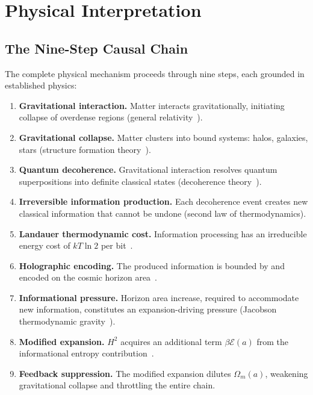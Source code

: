 \documentclass[twocolumn,superscriptaddress,prl,amsmath,amssymb]{revtex4-2}
\begin{document}
\section{Physical Interpretation}
\label{sec:interpretation}

\subsection{The Nine-Step Causal Chain}

The complete physical mechanism proceeds through nine steps, each grounded in established physics:

\begin{enumerate}
\item \textbf{Gravitational interaction.} Matter interacts gravitationally, initiating collapse of overdense regions (general relativity~\cite{Einstein1915}).
\item \textbf{Gravitational collapse.} Matter clusters into bound systems: halos, galaxies, stars (structure formation theory~\cite{Peebles1980}).
\item \textbf{Quantum decoherence.} Gravitational interaction resolves quantum superpositions into definite classical states (decoherence theory~\cite{Zurek2003}).
\item \textbf{Irreversible information production.} Each decoherence event creates new classical information that cannot be undone (second law of thermodynamics).
\item \textbf{Landauer thermodynamic cost.} Information processing has an irreducible energy cost of $kT\ln 2$ per bit~\cite{Landauer1961}.
\item \textbf{Holographic encoding.} The produced information is bounded by and encoded on the cosmic horizon area~\cite{Bekenstein1973,tHooft1993,Susskind1995}.
\item \textbf{Informational pressure.} Horizon area increase, required to accommodate new information, constitutes an expansion-driving pressure (Jacobson thermodynamic gravity~\cite{Jacobson1995}).
\item \textbf{Modified expansion.} $H^2$ acquires an additional term $\beta\mathcal{E}(a)$ from the informational entropy contribution~\cite{Mahaffey2026main}.
\item \textbf{Feedback suppression.} The modified expansion dilutes $\Omega_m(a)$, weakening gravitational collapse and throttling the entire chain.
\end{enumerate}
\end{document}
